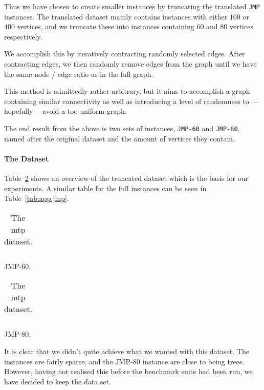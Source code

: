  Thus we have chosen to create smaller instances by truncating the translated \texttt{JMP}
 instances. The translated dataset mainly contains instances with either $100$ or $400$ vertices,
 and we truncate these into instances containing $60$ and $80$ vertices respectively.

 We accomplish this by iteratively contracting randomly selected edges. After contracting edges,
 we then randomly remove edges from the graph until we have the same node / edge ratio as in the
 full graph.

 This method is admittedly rather arbitrary, but it aims to accomplish a graph containing similar
 connectivity as well as introducing a level of randomness to ---hopefully--- avoid a too uniform graph.

 The end result from the above is two sets of instances, \texttt{JMP-60} and \texttt{JMP-80}, named
 after the original dataset and the amount of vertices they contain.

\paragraph{The Dataset}
Table~\ref{tab:mtp:dataset} shows an overview of the truncated dataset which is the basis for our
experiments. A similar table for the full instances can be seen in Table~\ref{tab:app:jmp}.

\begin{table}[h!]
  \centering
  \begin{subtable}{0.45\linewidth}
    \centering
    \begin{tabular}[h!]{c|c|c}
      
    \end{tabular}
    \caption{JMP-60.}
  \end{subtable}
  \begin{subtable}{0.45\linewidth}
    \centering
  \begin{tabular}[h!]{c|c|c}
    
  \end{tabular}
  \caption{JMP-80.}
  \end{subtable}
  \caption{The \gls{mtp} dataset.}\label{tab:mtp:dataset}
\end{table}

It is clear that we didn't quite achieve what we wanted with this dataset. The instances are fairly
sparse, and the JMP-80 instance are close to being trees. However, having not realised this before
the benchmark suite had been run, we have decided to keep the data set.

